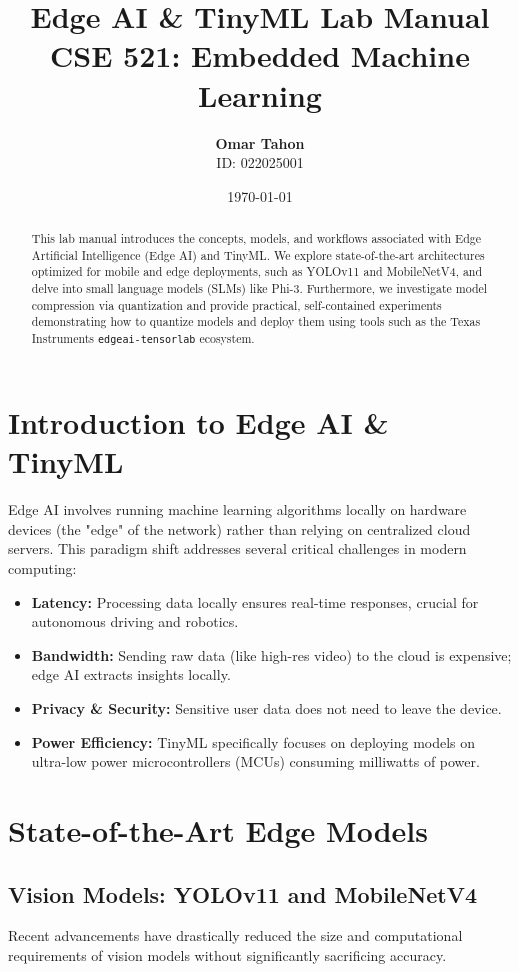 \documentclass[12pt, a4paper]{article}
\title{\textbf{\Huge Edge AI \& TinyML Lab Manual} \\ \vspace{0.5cm} \Large CSE 521: Embedded Machine Learning}
\author{\textbf{Omar Tahon} \\ ID: 022025001}
\date{\today}
\begin{document}
\maketitle

\begin{abstract}
This lab manual introduces the concepts, models, and workflows associated with Edge Artificial Intelligence (Edge AI) and TinyML. We explore state-of-the-art architectures optimized for mobile and edge deployments, such as YOLOv11 and MobileNetV4, and delve into small language models (SLMs) like Phi-3. Furthermore, we investigate model compression via quantization and provide practical, self-contained experiments demonstrating how to quantize models and deploy them using tools such as the Texas Instruments \texttt{edgeai-tensorlab} ecosystem.
\end{abstract}

\tableofcontents
\newpage

\section{Introduction to Edge AI \& TinyML}
Edge AI involves running machine learning algorithms locally on hardware devices (the "edge" of the network) rather than relying on centralized cloud servers. This paradigm shift addresses several critical challenges in modern computing:
\begin{itemize}
    \item \textbf{Latency:} Processing data locally ensures real-time responses, crucial for autonomous driving and robotics.
    \item \textbf{Bandwidth:} Sending raw data (like high-res video) to the cloud is expensive; edge AI extracts insights locally.
    \item \textbf{Privacy \& Security:} Sensitive user data does not need to leave the device.
    \item \textbf{Power Efficiency:} TinyML specifically focuses on deploying models on ultra-low power microcontrollers (MCUs) consuming milliwatts of power.
\end{itemize}

\section{State-of-the-Art Edge Models}

\subsection{Vision Models: YOLOv11 and MobileNetV4}
Recent advancements have drastically reduced the size and computational requirements of vision models without significantly sacrificing accuracy.
\end{document}
